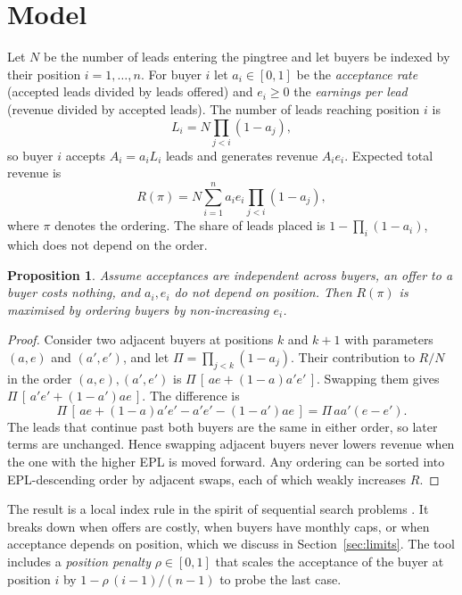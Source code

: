 \documentclass[10pt,a4paper]{article}
\newtheorem{proposition}{Proposition}
\begin{document}
\section{Model}
Let $N$ be the number of leads entering the pingtree and let buyers be indexed by their position $i=1,\dots,n$. For buyer $i$ let $a_i\in[0,1]$ be the \emph{acceptance rate} (accepted leads divided by leads offered) and $e_i\ge 0$ the \emph{earnings per lead} (revenue divided by accepted leads). The number of leads reaching position $i$ is
\begin{equation}
 L_i = N\prod_{j<i}(1-a_j),
\end{equation}
so buyer $i$ accepts $A_i=a_iL_i$ leads and generates revenue $A_ie_i$. Expected total revenue is
\begin{equation}
 R(\pi)=N\sum_{i=1}^{n} a_i e_i \prod_{j<i}(1-a_j),
\end{equation}
where $\pi$ denotes the ordering. The share of leads placed is $1-\prod_i(1-a_i)$, which does not depend on the order.

\begin{proposition}\label{prop:order}
Assume acceptances are independent across buyers, an offer to a buyer costs nothing, and $a_i,e_i$ do not depend on position. Then $R(\pi)$ is maximised by ordering buyers by non-increasing $e_i$.
\end{proposition}
\begin{proof}
Consider two adjacent buyers at positions $k$ and $k+1$ with parameters $(a,e)$ and $(a',e')$, and let $\Pi=\prod_{j<k}(1-a_j)$. Their contribution to $R/N$ in the order $(a,e),(a',e')$ is $\Pi\,[\,ae+(1-a)a'e'\,]$. Swapping them gives $\Pi\,[\,a'e'+(1-a')ae\,]$. The difference is
\begin{equation}
 \Pi\,[\,ae+(1-a)a'e'-a'e'-(1-a')ae\,]=\Pi\,aa'(e-e').
\end{equation}
The leads that continue past both buyers are the same in either order, so later terms are unchanged. Hence swapping adjacent buyers never lowers revenue when the one with the higher EPL is moved forward. Any ordering can be sorted into EPL-descending order by adjacent swaps, each of which weakly increases $R$. \qedhere
\end{proof}
The result is a local index rule in the spirit of sequential search problems \cite{weitzman}. It breaks down when offers are costly, when buyers have monthly caps, or when acceptance depends on position, which we discuss in Section~\ref{sec:limits}. The tool includes a \emph{position penalty} $\rho\in[0,1]$ that scales the acceptance of the buyer at position $i$ by $1-\rho\,(i-1)/(n-1)$ to probe the last case.
\end{document}
